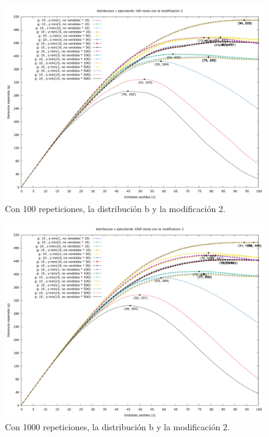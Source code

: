 \documentclass[12pt, spanish]{article}
\begin{document}
\begin{figure}[H]
	\centering
	\includegraphics[scale = 0.2]{prob_c/datos_c_100_2.png}
	\caption{Con 100 repeticiones, la distribución b y la modificación 2.}
	\label{fig:ej1_a_100}

\end{figure}

\begin{figure}[H]
	\centering
	\includegraphics[scale = 0.2]{prob_c/datos_c_1000_2.png}
	\caption{Con 1000 repeticiones, la distribución b y la modificación 2.}
	\label{fig:ej1_a_1000}

\end{figure}
\end{document}
